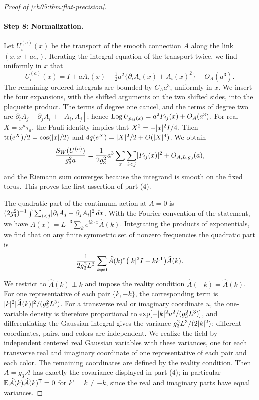 \begin{proof}[Proof of \cref{ch05:thm:flat-precision}]
\paragraph{Step 8: Normalization.}
Let $U_i^{(a)}(x)$ be the transport of the smooth connection $A$ along the link $(x,x+ae_i)$. Iterating the integral equation of the transport twice, we find uniformly in $x$ that
\[
 U_i^{(a)}(x)=I+aA_i(x)+\tfrac12a^2\{\partial_iA_i(x)+A_i(x)^2\}+O_A(a^3).
\]
The remaining ordered integrals are bounded by $C_Aa^3$, uniformly in $x$. We insert the four expansions, with the shifted arguments on the two shifted sides, into the plaquette product. The terms of degree one cancel, and the terms of degree two are $\partial_iA_j-\partial_jA_i+[A_i,A_j]$; hence $\operatorname{Log} U_{p_{ij}(x)}=a^2F_{ij}(x)+O_A(a^3)$. For real $X=x^a\tau_a$, the Pauli identity implies that $X^2=-\lvert x\rvert^2I/4$. Then $\operatorname{tr}(e^X)/2=\cos(\lvert x\rvert/2)$ and $4q(e^X)=\lvert X\rvert^2/2+O(\lvert X\rvert^4)$. We obtain
\[
 \frac{S_W(U^{(a)})}{g_3^2a}=\frac1{2g_3^2}a^3\sum_x\sum_{i<j}\lvert F_{ij}(x)\rvert^2+O_{A,L,g_3}(a),
\]
and the Riemann sum converges because the integrand is smooth on the fixed torus. This proves the first assertion of part (4).

The quadratic part of the continuum action at $A=0$ is $(2g_3^2)^{-1}\int\sum_{i<j}\lvert \partial_iA_j-\partial_jA_i\rvert^2\,dx$. With the Fourier convention of the statement, we have $A(x)=L^{-3}\sum_ke^{ik\cdot x}\widehat A(k)$. Integrating the products of exponentials, we find that on any finite symmetric set of nonzero frequencies the quadratic part is
\[
 \frac1{2g_3^2L^3}\sum_{k\ne0}\widehat A(k)^*\bigl(\lvert k\rvert^2I-kk^{\mathsf T}\bigr)\widehat A(k).
\]
We restrict to $\widehat A(k)\perp k$ and impose the reality condition $\widehat A(-k)=\overline{\widehat A(k)}$. For one representative of each pair $\{k,-k\}$, the corresponding term is $\lvert k\rvert^2\lvert \widehat A(k)\rvert^2/(g_3^2L^3)$. For a transverse real or imaginary coordinate $u$, the one-variable density is therefore proportional to $\exp[-\lvert k\rvert^2u^2/(g_3^2L^3)]$, and differentiating the Gaussian integral gives the variance $g_3^2L^3/(2\lvert k\rvert^2)$; different coordinates, pairs, and colors are independent. We realize the field by independent centered real Gaussian variables with these variances, one for each transverse real and imaginary coordinate of one representative of each pair and each color. The remaining coordinates are defined by the reality condition. Then $A=g_3\mathcal A$ has exactly the covariance displayed in part (4); in particular $\mathbb E\widehat{\mathcal A}(k)\widehat{\mathcal A}(k)^{\mathsf T}=0$ for $k'=k\ne-k$, since the real and imaginary parts have equal variances.


\end{proof}
